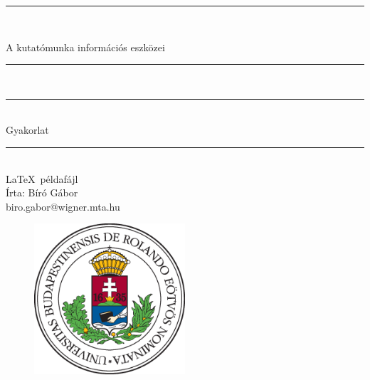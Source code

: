 \documentclass[a4paper, 12pt]{article}
\numberwithin{equation}{section}          %
\numberwithin{figure}{subsection}
\begin{document}
\begin{titlepage}   
\begin{center}
\thispagestyle{empty}  

\vspace*{0.7cm}
\rule{\linewidth}{0.5mm} \\[3mm]
\vspace*{0.7cm}

{\LARGE A kutatómunka információs eszközei}

\vspace*{0.7cm}
\rule{\linewidth}{0.5mm} \\[3mm]
\rule{\linewidth}{0.5mm} \\[3mm]



{\Large Gyakorlat\\}

\vspace*{0.7cm}
\rule{\linewidth}{0.5mm} \\[3mm]
  {\small \LaTeX\ példafájl} \\[3mm]
  \vspace*{1cm}
{\footnotesize Írta: Bíró Gábor} \\
{\tiny biro.gabor@wigner.mta.hu}

  \vspace*{2cm}

\begin{figure}[h!]
\begin{center}
\includegraphics[width=0.5\textwidth]{./elte.eps}
\end{center}
\end{figure}

\end{center}
\end{titlepage}
\end{document}
